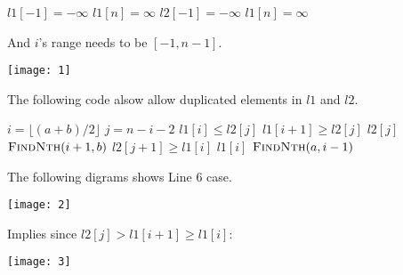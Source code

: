\documentclass[12pt,twoside]{article}
\begin{document}
\begin{codebox}
\li $l1[-1] = -\infty$
\li $l1[n] = \infty$
\li $l2[-1] = -\infty$
\li $l1[n] = \infty$
\end{codebox}

And $i$'s range needs to be $[-1, n-1]$.

\texttt{[image: 1]}


The following code alsow allow duplicated elements in $l1$ and $l2$.

\begin{codebox}
\li $i = \lfloor(a+b)/2\rfloor$
\li $j = n - i - 2$
\li \If $l1[i] \le l2[j]$
\li \Then \If $l1[i+1] \ge l2[j]$
\li \Then \Return $l2[j]$
\li \Else \Return $\textnormal{\scshape FindNth}(i+1, b)$
\End
\li \Else \If $l2[j+1] \ge l1[i]$
\li \Then \Return $l1[i]$
\li \Else \Return $\textnormal{\scshape FindNth}(a, i-1)$
\End
\End
\end{codebox}

The following digrams shows Line $6$ case.

\texttt{[image: 2]}

Implies since $l2[j] > l1[i+1] \ge l1[i]$:

\texttt{[image: 3]}
\end{document}
